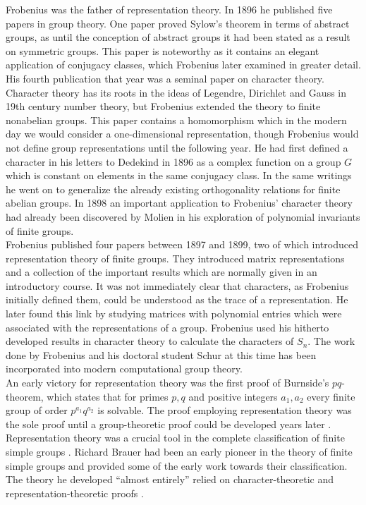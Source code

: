 Frobenius was the father of representation theory. In 1896 he published five papers in group theory. One paper proved Sylow's theorem in terms of abstract groups, as until the conception of abstract groups it had been stated as a result on symmetric groups. This paper is noteworthy as it contains an elegant application of conjugacy classes, which Frobenius later examined in greater detail. His fourth publication that year was a seminal paper on character theory. Character theory has its roots in the ideas of Legendre, Dirichlet and Gauss in 19th century number theory, but Frobenius extended the theory to finite nonabelian groups. This paper contains a homomorphism which in the modern day we would consider a one-dimensional representation, though Frobenius would not define group representations until the following year. He had first defined a character in his letters to Dedekind in 1896 as a complex function on a group $G$ which is constant on elements in the same conjugacy class. In the same writings he went on to generalize the already existing orthogonality relations for finite abelian groups. In 1898 an important application to Frobenius' character theory had already been discovered by Molien in his exploration of polynomial invariants of finite groups.\\

Frobenius published four papers between 1897 and 1899, two of which introduced representation theory of finite groups. They introduced matrix representations and a collection of the important results which are normally given in an introductory course. It was not immediately clear that characters, as Frobenius initially defined them, could be understood as the trace of a representation. He later found this link by studying matrices with polynomial entries which were associated with the representations of a group. Frobenius used his hitherto developed results in character theory to calculate the characters of $S_n$. The work done by Frobenius and his doctoral student Schur at this time has been incorporated into modern computational group theory.\\

An early victory for representation theory was the first proof of Burnside's $pq$-theorem, which states that for primes $p,q$ and positive integers $a_1,a_2$ every finite group of order $p^{a_1}q^{a_2}$ is solvable. The proof employing representation theory was the sole proof until a group-theoretic proof could be developed years later \cite[page 1]{1}. Representation theory was a crucial tool in the complete classification of finite simple groups \cite[page 1]{1}. Richard Brauer had been an early pioneer in the theory of finite simple groups and provided some of the early work towards their classification. The theory he developed ``almost entirely'' relied on character-theoretic and representation-theoretic proofs \cite[page 1]{14}.\\

